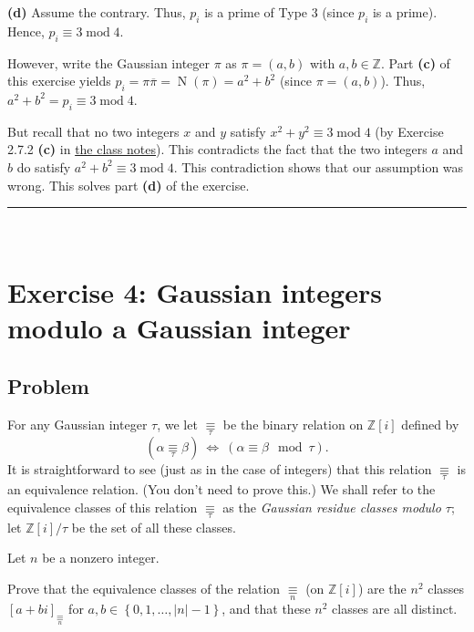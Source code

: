 \documentclass[paper=a4, fontsize=12pt]{scrartcl}%
\theoremstyle{plainsl}
\theoremstyle{definition}
\theoremstyle{remark}
\begin{document}
\bigskip

\textbf{(d)} Assume the contrary. Thus, $p_{i}$ is a prime of Type 3 (since
$p_{i}$ is a prime). Hence, $p_{i}\equiv3\operatorname{mod}4$.

However, write the Gaussian integer $\pi$ as $\pi=\left(  a,b\right)  $ with
$a,b\in\mathbb{Z}$. Part \textbf{(c)} of this exercise yields $p_{i}%
=\pi\overline{\pi}=\operatorname*{N}\left(  \pi\right)  =a^{2}+b^{2}$ (since
$\pi=\left(  a,b\right)  $). Thus, $a^{2}+b^{2}=p_{i}\equiv3\operatorname{mod}%
4$.

But recall that no two integers $x$ and $y$ satisfy $x^{2}+y^{2}%
\equiv3\operatorname{mod}4$ (by Exercise 2.7.2 \textbf{(c)} in
\href{http://www.cip.ifi.lmu.de/~grinberg/t/19s/notes.pdf}{the class
notes}). This contradicts the fact that the two integers $a$ and $b$ do
satisfy $a^{2}+b^{2}\equiv3\operatorname{mod}4$. This contradiction shows that
our assumption was wrong. This solves part \textbf{(d)} of the exercise.

\rule{\linewidth}{0.3pt} \\[0.4cm]

\section{Exercise 4: Gaussian integers modulo a Gaussian integer}

\subsection{Problem}

For any Gaussian integer $\tau$, we let $\underset{\tau}{\equiv}$ be the
binary relation on $\mathbb{Z}\left[  i \right]  $ defined by
\[
\left(  \alpha\underset{\tau}{\equiv} \beta\right)  \ \iff\ \left(
\alpha\equiv\beta\mod \tau \right)  .
\]
It is straightforward to see (just as in the case of integers) that this
relation $\underset{\tau}{\equiv}$ is an equivalence relation. (You don't need
to prove this.) We shall refer to the equivalence classes of this relation
$\underset{\tau}{\equiv}$ as the \textit{Gaussian residue classes modulo
$\tau$}; let $\mathbb{Z}\left[  i \right]  / \tau$ be the set of all these classes.

Let $n$ be a nonzero integer.

Prove that the equivalence classes of the relation $\underset{n}{\equiv}$ (on
$\mathbb{Z}\left[  i \right]  $) are the $n^{2}$ classes $\left[  a + bi
\right]  _{\underset{n}{\equiv}}$ for $a, b \in\left\{  0, 1, \ldots, \left|
n \right|  -1 \right\}  $, and that these $n^{2}$ classes are all distinct.
\end{document}
